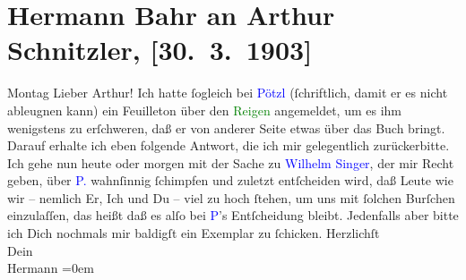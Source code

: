 

               \section[Hermann Bahr an Arthur Schnitzler, {[}30. 3. 1903{]}]{ Hermann Bahr an Arthur Schnitzler, {[}30. 3. 1903{]}}\nopagebreak{}\rehead{ }\normalsize\beginnumbering{} \toendnotes[C]{\smallbreak\pagebreak[2]} 
\pstart
           \raggedleft{}{\pb}Montag\pend
           \pstart\center{}Lieber Arthur!\pend\pstart
           Ich hatte ſogleich bei \textcolor{blue}{Pötzl}{}\ledrightnote{\textcolor{blue}{Eduard Pötzl}} (ſchriftlich,
               damit er es nicht ableugnen kann) ein Feuilleton über den \textcolor{green}{Reigen}{}\ledrightnote{\textcolor{green}{Reigen. Zehn Dialoge}} angemeldet, um es ihm wenigstens zu erſchweren, daß er von
               anderer Seite etwas über das Buch bringt. Darauf erhalte ich eben folgende Antwort,
               die ich mir gelegentlich zurückerbitte. Ich gehe nun heute oder morgen mit der Sache
               zu \textcolor{blue}{Wilhelm Singer}{}\ledrightnote{\textcolor{blue}{Wilhelm Singer}}, der mir Recht geben, über
                  \textcolor{blue}{P.}{}\ledrightnote{\textcolor{blue}{Eduard Pötzl}} wahnſinnig ſchimpfen und zuletzt
               entſcheiden wird, daß Leute wie wir – nemlich {\pb}Er,
               Ich und Du – viel zu hoch ſtehen, um uns mit ſolchen Burſchen einzulaſſen, das heißt
               daß es alſo bei \textcolor{blue}{P}{}\ledrightnote{\textcolor{blue}{Eduard Pötzl}}’s Entſcheidung bleibt.\pend
           \pstart
           Jedenfalls aber bitte ich Dich nochmals mir baldigſt ein Exemplar zu ſchicken.\pend
           \pstart
           Herzlichſt{\\[\baselineskip]}Dein{\\[\baselineskip]}\spacefill\mbox{Hermann}\pend
           \leftskip=0em{}\endnumbering{}  
      